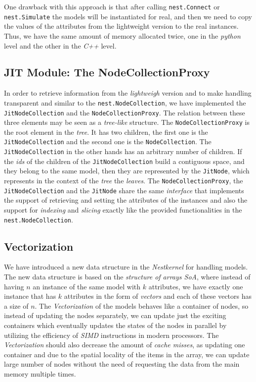 One drawback with this approach is that after calling \texttt{nest.Connect} or \texttt{nest.Simulate} the models will be instantiated for real, and then we need to copy the values of the attributes from the lightweight version to the real instances. Thus, we have the same amount of memory allocated twice, one in the \emph{python} level and the other in the \emph{C++} level.

\subsection*{JIT Module: The NodeCollectionProxy}

In order to retrieve information from the \emph{lightweigh} version and to make handling transparent and similar to the \texttt{nest.NodeCollection}, we have implemented the \texttt{JitNodeCollection} and the \texttt{NodeCollectionProxy}. The relation between these three elements may be seen as a \emph{tree-like} structure. The \texttt{NodeCollectionProxy} is the root element in the \emph{tree}. It has two children, the first one is the \texttt{JitNodeCollection} and the second one is the \texttt{NodeCollection}. The \texttt{JitNodeCollection} in the other hands has an arbitrary  number of children. If the \emph{ids} of the children of the \texttt{JitNodeCollection} build a contiguous space, and they belong to the same model, then they are represented by the \texttt{JitNode}, which represents in the context of the \emph{tree} the \emph{leaves}. The \texttt{NodeCollectionProxy}, the \texttt{JitNodeCollection} and the \texttt{JitNode} share the same \emph{interface} that implements the support of retrieving and setting the attributes of the instances and also the support for \emph{indexing} and \emph{slicing} exactly like the provided functionalities in the \texttt{nest.NodeCollection}.

\subsection*{Vectorization}

We have introduced a new data structure in the \emph{Nestkernel} for handling models. The new data structure is based on the \emph{structure of arrays SoA}, where instead of having $n$ an instance of the same model with $k$ attributes, we have exactly one instance  that has $k$ attributes in the form of \emph{vectors} and each of these vectors has a size of $n$. The \emph{Vectorization} of the models behaves like a container of nodes, so instead of updating the nodes separately, we can update just the exciting containers which eventually updates the states of the nodes in parallel by utilizing the efficiency of \emph{SIMD} instructions in modern processors. The \emph{Vectorization} should also decrease the amount of \emph{cache misses}, as  updating one container and due to the spatial locality of the items in the array, we can update large number of nodes without the need of requesting the data from the main memory multiple times.


